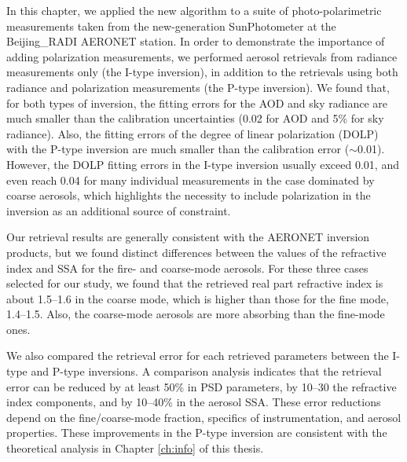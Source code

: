 In this chapter, we applied the new algorithm to a suite of photo-polarimetric
measurements taken from the new-generation SunPhotometer at the Beijing\_RADI
AERONET station. In order to demonstrate the importance of adding polarization
measurements, we performed aerosol retrievals from radiance measurements only
(the I-type inversion), in addition to the retrievals using both radiance and
polarization measurements (the P-type inversion). We found that, for both types
of inversion, the fitting errors for the AOD and sky radiance are much smaller
than the calibration uncertainties (0.02 for AOD and 5\% for sky radiance).
Also, the fitting errors of the degree of linear polarization (DOLP) with the
P-type inversion are much smaller than the calibration error ($\sim$0.01). However,
the DOLP fitting errors in the I-type inversion usually exceed 0.01, and even
reach 0.04 for many individual measurements in the case dominated by coarse
aerosols, which highlights the necessity to include polarization in the
inversion as an additional source of constraint.

Our retrieval results are generally consistent with the AERONET inversion
products, but we found distinct differences between the values of the
refractive index and SSA for the fire- and coarse-mode aerosols. For these
three cases selected for our study, we found that the retrieved real part
refractive index is about 1.5--1.6 in the coarse mode, which is higher than
those for the fine mode, 1.4--1.5. Also, the coarse-mode aerosols are more
absorbing than the fine-mode ones.

We also compared the retrieval error for each retrieved parameters between the
I-type and P-type inversions. A comparison analysis indicates that the
retrieval error can be reduced by at least 50\% in PSD parameters, by 10–30%
the refractive index components, and by 10--40\% in the aerosol SSA. These error
reductions depend on the fine/coarse-mode fraction, specifics of
instrumentation, and aerosol properties. These improvements in the P-type
inversion are consistent with the theoretical analysis in Chapter \ref{ch:info}
of this thesis.

